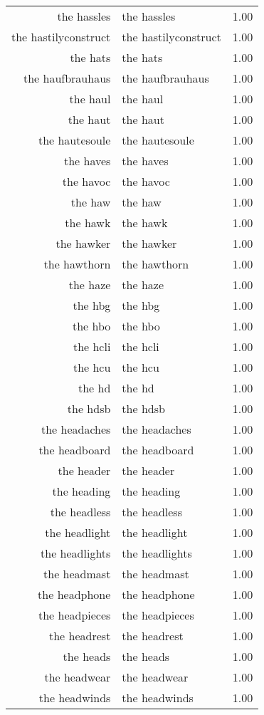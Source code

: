 \begin{table}[ht]
\begin{tabular}{rlr}
  the hassles & the hassles & 1.00 \\ 
  the hastilyconstruct & the hastilyconstruct & 1.00 \\ 
  the hats & the hats & 1.00 \\ 
  the haufbrauhaus & the haufbrauhaus & 1.00 \\ 
  the haul & the haul & 1.00 \\ 
  the haut & the haut & 1.00 \\ 
  the hautesoule & the hautesoule & 1.00 \\ 
  the haves & the haves & 1.00 \\ 
  the havoc & the havoc & 1.00 \\ 
  the haw & the haw & 1.00 \\ 
  the hawk & the hawk & 1.00 \\ 
  the hawker & the hawker & 1.00 \\ 
  the hawthorn & the hawthorn & 1.00 \\ 
  the haze & the haze & 1.00 \\ 
  the hbg & the hbg & 1.00 \\ 
  the hbo & the hbo & 1.00 \\ 
  the hcli & the hcli & 1.00 \\ 
  the hcu & the hcu & 1.00 \\ 
  the hd & the hd & 1.00 \\ 
  the hdsb & the hdsb & 1.00 \\ 
  the headaches & the headaches & 1.00 \\ 
  the headboard & the headboard & 1.00 \\ 
  the header & the header & 1.00 \\ 
  the heading & the heading & 1.00 \\ 
  the headless & the headless & 1.00 \\ 
  the headlight & the headlight & 1.00 \\ 
  the headlights & the headlights & 1.00 \\ 
  the headmast & the headmast & 1.00 \\ 
  the headphone & the headphone & 1.00 \\ 
  the headpieces & the headpieces & 1.00 \\ 
  the headrest & the headrest & 1.00 \\ 
  the heads & the heads & 1.00 \\ 
  the headwear & the headwear & 1.00 \\ 
  the headwinds & the headwinds & 1.00 \\ 

\end{tabular}
\end{table}
